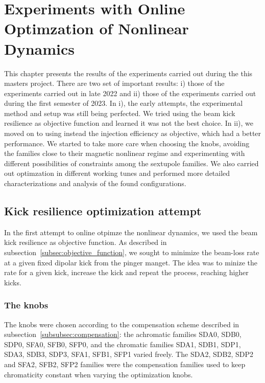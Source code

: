 \chapter{Experiments with Online Optimzation of Nonlinear Dynamics}
This chapter presents the results of the experiments carried out during the this masters project. There are two set of important results: i) those of the experiments carried out in late 2022 and ii) those of the experiments carried out during the first semester of 2023. In i), the early attempts, the experimental method and setup was still being perfected. We tried using the beam kick resilience as objective function and learned it was not the best choice. In ii), we moved on to using instead the injection efficiency as objective, which had a better performance.  We started to take more care when choosing the knobs, avoiding the families close to their magnetic nonlinear regime and experimenting with different possibilities of constraints among the sextupole families. We also carried out optimzation in different working tunes and performed more detailed characterizations and analysis of the found configurations.
\section{Kick resilience optimization attempt}
In the first attempt to online otpimze the nonlinear dynamics, we used the beam kick resilience as objective function. As described in subsection~\ref{subsec:objective_function}, we sought to minimize the beam-loss rate at a given fixed dipolar kick from the pinger manget. The idea was to minize the rate for a given kick, increase the kick and repeat the process, reaching higher kicks.
\subsection{The knobs}
The knobs were chosen according to the compensation scheme described in subsection~\ref{subsubsec:compensation}: the achromatic families SDA0, SDB0, SDP0, SFA0, SFB0, SFP0, and the chromatic families SDA1, SDB1, SDP1, SDA3, SDB3, SDP3, SFA1, SFB1, SFP1 varied freely. The SDA2, SDB2, SDP2 and SFA2, SFB2, SFP2 families were the compensation families used to keep chromaticity constant when varying the optimization knobs.
